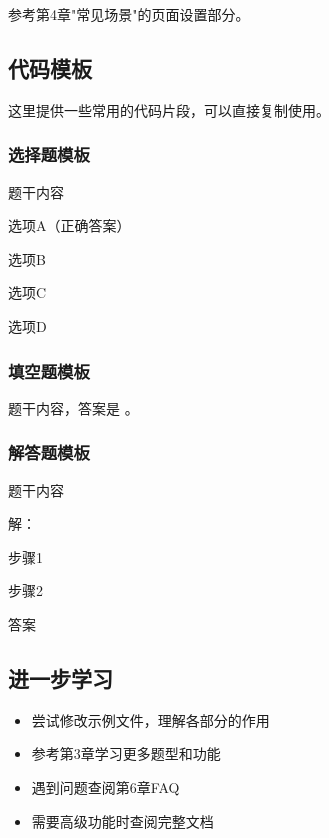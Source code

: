 参考第4章"常见场景"的页面设置部分。

\subsection{代码模板}

这里提供一些常用的代码片段，可以直接复制使用。

\subsubsection{选择题模板}

\begin{latexcode}
  \begin{question}
    题干内容 \paren[A]
    \begin{choices}
      \item 选项A（正确答案）
      \item 选项B
      \item 选项C
      \item 选项D
    \end{choices}
  \end{question}
\end{latexcode}

\subsubsection{填空题模板}

\begin{latexcode}
  \begin{question}
    题干内容，答案是 \fillin[答案] 。
  \end{question}
\end{latexcode}

\subsubsection{解答题模板}

\begin{latexcode}
  \begin{problem}[points = 10]
    题干内容

    \begin{solution}
      解：

      步骤1 

      步骤2 

      答案 
    \end{solution}
  \end{problem}
\end{latexcode}

\subsection{进一步学习}

\begin{itemize}
  \item 尝试修改示例文件，理解各部分的作用
  \item 参考第3章学习更多题型和功能
  \item 遇到问题查阅第6章FAQ
  \item 需要高级功能时查阅完整文档 
\end{itemize}
